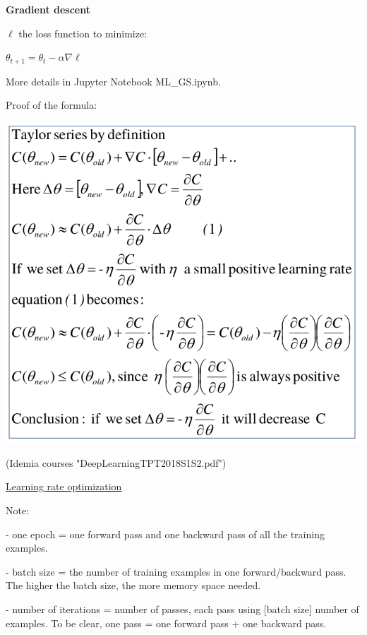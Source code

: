 {\fontsize{12pt}{22pt} \textbf{Gradient descent}\par}

\vspace{5mm}

$\ell$ the loss function to minimize:

$\theta_{t+1}=\theta_t - \alpha \nabla \ell$

More details in Jupyter Notebook ML\_GS.ipynb.

Proof of the formula:

\includegraphics[scale=0.3]{../images/GradientDescent_proof.png}

(Idemia courses "DeepLearningTPT2018S1S2.pdf")

\vspace{5mm}
\underline{Learning rate optimization}
\vspace{5mm}

Note:

- one epoch = one forward pass and one backward pass of all the training examples.

- batch size = the number of training examples in one forward/backward pass. The higher the batch size, the more memory space needed.

- number of iterations = number of passes, each pass using [batch size] number of examples. To be clear, one pass = one forward pass + one backward pass.

\vspace{5mm}

